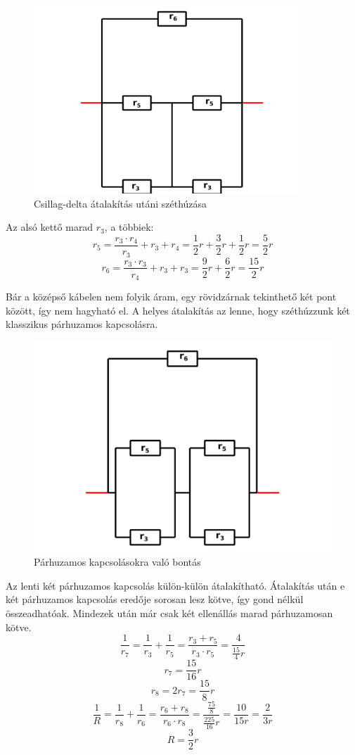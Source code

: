 \documentclass[11pt,a4paper,openany,leqno]{article}
\begin{document}
\begin{figure}[h!]
\centering
  \includegraphics[width=100mm,scale=0.5]{grid_2_5.pdf}
  \caption{Csillag-delta átalakítás utáni széthúzása}
  \label{}
\end{figure}
Az alsó kettő marad $r_3$, a többiek:
$$ r_5 = \frac{r_3 \cdot r_4}{r_3} + r_3 + r_4 = \frac{1}{2}r + \frac{3}{2}r + \frac{1}{2}r = \frac{5}{2}r $$
$$ r_6 = \frac{r_3 \cdot r_3}{r_4} + r_3 + r_3 = \frac{9}{2}r + \frac{6}{2}r = \frac{15}{2}r$$


Bár a középső kábelen nem folyik áram, egy rövidzárnak tekinthető két pont között, így nem hagyható el. A helyes átalakítás az lenne, hogy széthúzzunk két klasszikus párhuzamos kapcsolásra.\\

\begin{figure}[h!]
\centering
  \includegraphics[width=150mm,scale=0.5]{grid_2_6.pdf}
  \caption{Párhuzamos kapcsolásokra való bontás}
  \label{}
\end{figure}
\indent
Az lenti két párhuzamos kapcsolás külön-külön átalakítható. Átalakítás után e két párhuzamos kapcsolás eredője sorosan lesz kötve, így gond nélkül összeadhatóak. Mindezek után már csak két ellenállás marad párhuzamosan kötve.\\
$$ \frac{1}{r_7} = \frac{1}{r_3} + \frac{1}{r_5} = \frac{r_3 + r_5}{r_3 \cdot r_5} = \frac{4}{\frac{15}{4}r} $$
$$ r_7 = \frac{15}{16}r $$
$$ r_8 = 2r_7 = \frac{15}{8}r $$
$$ \frac{1}{R} = \frac{1}{r_8} + \frac{1}{r_6} = \frac{r_6 + r_8}{r_6 \cdot r_8} = \frac{\frac{75}{8}}{\frac{225}{16}r} = \frac{10}{15r} = \frac{2}{3r} $$
$$ R = \frac{3}{2}r $$
\end{document}
